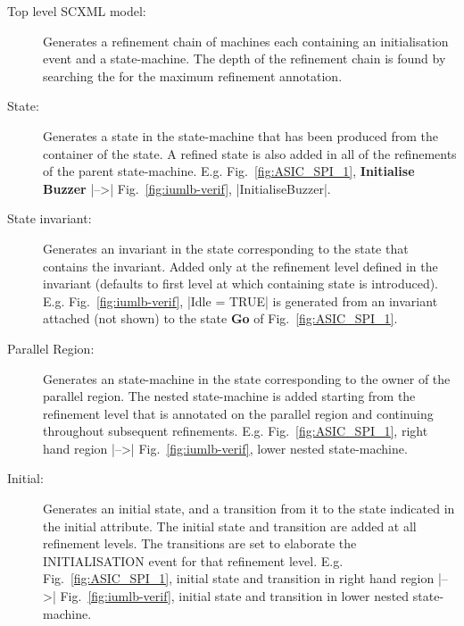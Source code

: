 \begin{description}
\item[Top level SCXML model:] Generates a refinement chain of \EventB machines each containing an initialisation event and a \iUMLB state-machine.
The depth of the refinement chain is found by searching the \SCXML for the maximum refinement annotation.


\item[State:] Generates a state in the \iUMLB state-machine that has been produced from the container of the \SCXML state. 
A refined state is also added in all of the refinements of the parent \iUMLB state-machine. 
E.g. Fig.~\ref{fig:ASIC_SPI_1}, \textbf{Initialise Buzzer} |-->| Fig.~\ref{fig:iumlb-verif}, |InitialiseBuzzer|.

\item[State invariant:] Generates an invariant in the \iUMLB state corresponding to the \SCXML state that contains the invariant. 
Added only at the refinement level defined in the invariant (defaults to first level at which containing \iUMLB state is introduced). 
E.g. Fig.~\ref{fig:iumlb-verif}, |Idle = TRUE| is generated from an invariant attached (not shown) to the state \textbf{Go} of Fig.~\ref{fig:ASIC_SPI_1}.

\item[Parallel Region:] Generates an \iUMLB state-machine in the state corresponding to the owner of the parallel region. 
The nested \iUMLB state-machine is added starting from the refinement level that is annotated on the parallel region and continuing throughout subsequent refinements. 
E.g. Fig.~\ref{fig:ASIC_SPI_1}, right hand region |-->| Fig.~\ref{fig:iumlb-verif}, lower nested state-machine.


\item[Initial:] Generates an \iUMLB initial state, and a transition from it to the \iUMLB state indicated in the \SCXML initial attribute. 
The \iUMLB initial state and \iUMLB transition are added at all refinement levels. The \iUMLB transitions are set to elaborate the \EventB INITIALISATION event for that refinement level.
E.g. Fig.~\ref{fig:ASIC_SPI_1}, initial state and transition in right hand region |-->| Fig.~\ref{fig:iumlb-verif}, initial state and transition in lower nested state-machine.


\end{description}
